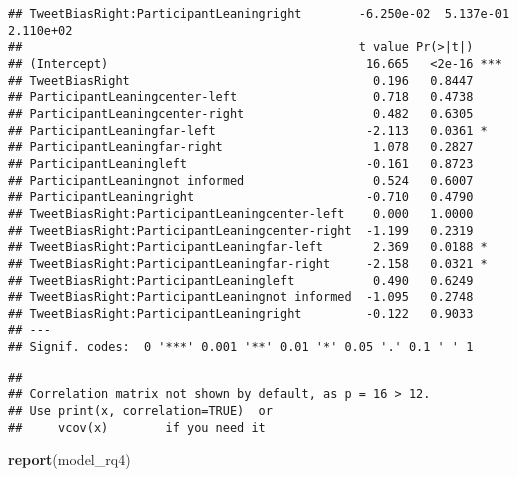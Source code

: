 \documentclass[
]{article}
\newenvironment{Shaded}{\begin{snugshade}}{\end{snugshade}}
\newcommand{\FunctionTok}[1]{\textcolor[rgb]{0.13,0.29,0.53}{\textbf{#1}}}
\newcommand{\NormalTok}[1]{#1}
\begin{document}
\begin{verbatim}
## TweetBiasRight:ParticipantLeaningright        -6.250e-02  5.137e-01  2.110e+02
##                                               t value Pr(>|t|)    
## (Intercept)                                    16.665   <2e-16 ***
## TweetBiasRight                                  0.196   0.8447    
## ParticipantLeaningcenter-left                   0.718   0.4738    
## ParticipantLeaningcenter-right                  0.482   0.6305    
## ParticipantLeaningfar-left                     -2.113   0.0361 *  
## ParticipantLeaningfar-right                     1.078   0.2827    
## ParticipantLeaningleft                         -0.161   0.8723    
## ParticipantLeaningnot informed                  0.524   0.6007    
## ParticipantLeaningright                        -0.710   0.4790    
## TweetBiasRight:ParticipantLeaningcenter-left    0.000   1.0000    
## TweetBiasRight:ParticipantLeaningcenter-right  -1.199   0.2319    
## TweetBiasRight:ParticipantLeaningfar-left       2.369   0.0188 *  
## TweetBiasRight:ParticipantLeaningfar-right     -2.158   0.0321 *  
## TweetBiasRight:ParticipantLeaningleft           0.490   0.6249    
## TweetBiasRight:ParticipantLeaningnot informed  -1.095   0.2748    
## TweetBiasRight:ParticipantLeaningright         -0.122   0.9033    
## ---
## Signif. codes:  0 '***' 0.001 '**' 0.01 '*' 0.05 '.' 0.1 ' ' 1
\end{verbatim}

\begin{verbatim}
## 
## Correlation matrix not shown by default, as p = 16 > 12.
## Use print(x, correlation=TRUE)  or
##     vcov(x)        if you need it
\end{verbatim}

\begin{Shaded}
\begin{Highlighting}[]
\FunctionTok{report}\NormalTok{(model\_rq4)}
\end{Highlighting}
\end{Shaded}
\end{document}
